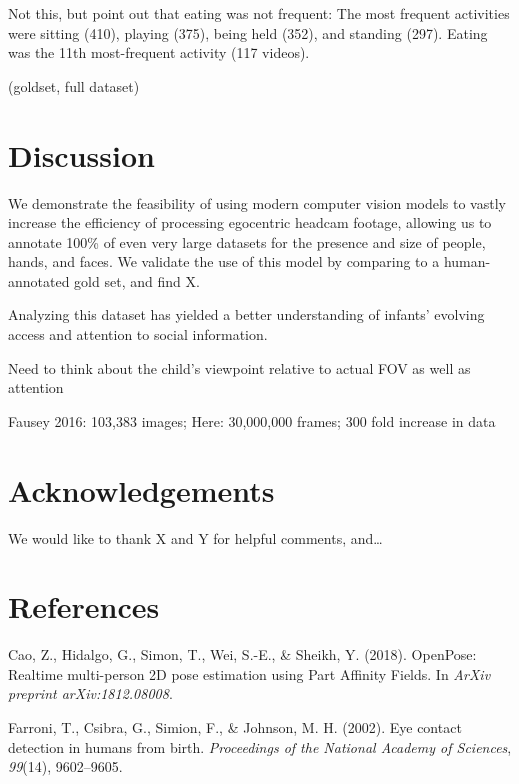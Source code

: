 \documentclass[10pt, letterpaper]{article}
\begin{document}
Not this, but point out that eating was not frequent: The most frequent
activities were sitting (410), playing (375), being held (352), and
standing (297). Eating was the 11th most-frequent activity (117 videos).

(goldset, full dataset)

\hypertarget{discussion}{%
\section{Discussion}\label{discussion}}

We demonstrate the feasibility of using modern computer vision models to
vastly increase the efficiency of processing egocentric headcam footage,
allowing us to annotate 100\% of even very large datasets for the
presence and size of people, hands, and faces. We validate the use of
this model by comparing to a human-annotated gold set, and find X.

Analyzing this dataset has yielded a better understanding of infants'
evolving access and attention to social information.

Need to think about the child's viewpoint relative to actual FOV as well
as attention

Fausey 2016: 103,383 images; Here: 30,000,000 frames; 300 fold increase
in data

\hypertarget{acknowledgements}{%
\section{Acknowledgements}\label{acknowledgements}}

We would like to thank X and Y for helpful comments, and\ldots{}

\hypertarget{references}{%
\section{References}\label{references}}

\setlength{\parindent}{-0.1in} 
\setlength{\leftskip}{0.125in}

\noindent

\hypertarget{refs}{}
\leavevmode\hypertarget{ref-Cao2018openpose}{}%
Cao, Z., Hidalgo, G., Simon, T., Wei, S.-E., \& Sheikh, Y. (2018).
OpenPose: Realtime multi-person 2D pose estimation using Part Affinity
Fields. In \emph{ArXiv preprint arXiv:1812.08008}.

\leavevmode\hypertarget{ref-Farroni2002}{}%
Farroni, T., Csibra, G., Simion, F., \& Johnson, M. H. (2002). Eye
contact detection in humans from birth. \emph{Proceedings of the
National Academy of Sciences}, \emph{99}(14), 9602--9605.
\end{document}
